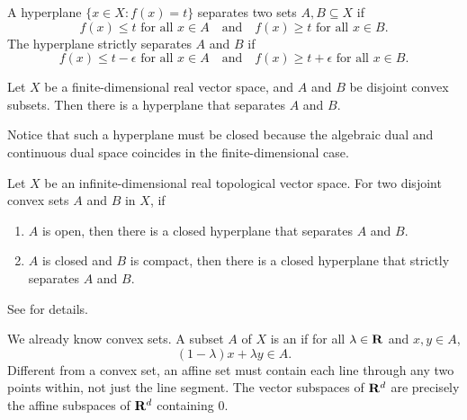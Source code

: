     A hyperplane $\{x \in X: f(x) = t\}$ separates two sets $A,B \subseteq X$ if \[
        f(x) \leq t \text{ for all }x\in A\quad \text{and} \quad f(x) \geq t \text{ for all }x\in B.
    \] The hyperplane strictly separates $A$ and $B$ if \[
        f(x) \leq t - \epsilon \text{ for all }x\in A\quad \text{and} \quad f(x) \geq t + \epsilon \text{ for all }x\in B.
    \]

    \begin{namedthm}
        Let $X$ be a finite-dimensional real vector space, and $A$ and $B$ be disjoint convex subsets. Then there is a hyperplane that separates $A$ and $B$.
    \end{namedthm}

    Notice that such a hyperplane must be closed because the algebraic dual and continuous dual space coincides in the finite-dimensional case.
    
    \begin{namedthm}
        Let $X$ be an infinite-dimensional real topological vector space. For two disjoint convex sets $A$ and $B$ in $X$, if \begin{enumerate}
            \item $A$ is open, then there is a closed hyperplane that separates $A$ and $B$.
            \item $A$ is closed and $B$ is compact, then there is a closed hyperplane that strictly separates $A$ and $B$.
        \end{enumerate}
    \end{namedthm}

    See \cite[Chapter~1]{Brezis_2011} for details.

    \begin{namedthm}
        
    \end{namedthm}

    \begin{namedthm}
        
    \end{namedthm}

    We already know convex sets. A subset $A$ of $X$ is an  if for all $\lambda \in \mathbf{R}$ and $x,y \in A$, \[
       (1 - \lambda) x + \lambda y \in A.
    \] Different from a convex set, an affine set must contain each line through any two points within, not just the line segment. The vector subspaces of $\mathbf{R}^d$ are precisely the affine subspaces of $\mathbf{R}^d$ containing $0$.
    
